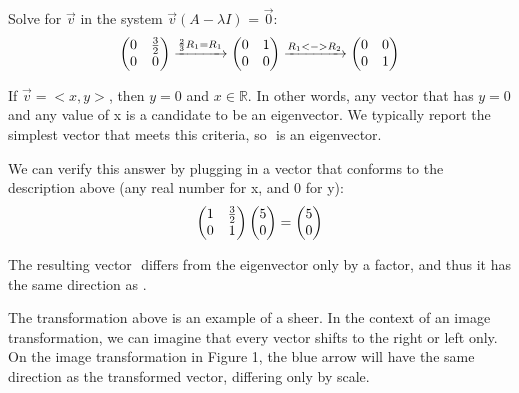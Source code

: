 \documentclass{article}
\begin{document}
 \par\noindent Solve for \( \vec v\) in the system \( \vec v (A - \lambda I)\) = \( \vec 0\):
 \[
  \left(\begin{array}{@{}cc@{}}
 	0 & \frac{3}{2} \\
 	0 & 0\\
 \end{array}\right) \xrightarrow[]{\frac{2}{3}R_1 = R_1} 
  \left(\begin{array}{@{}cc@{}}
 	0 & 1 \\
 	0 & 0\\
 \end{array}\right) \xrightarrow[]{R_1 <-> R_2}
  \left(\begin{array}{@{}cc@{}}
	0 & 0 \\
	0 & 1\\
\end{array}\right)
\]
\par \noindent If \( \vec v = <x,y> \), then \(y=0\) and \(x \in \mathbb{R}\). In other words, any vector that has \(y=0\) and any value of x is a candidate to be an eigenvector. We typically report the simplest vector that meets this criteria, so \(<1,0>\) is an eigenvector.
\newline
\newline
\newline
\begin{minipage}[c]{.5\linewidth}
\par \noindent We can verify this answer by plugging in a vector that conforms to the description above (any real number for x, and 0 for y):
\[ 
\left(\begin{array}{@{}cc@{}}
	1 & \frac{3}{2} \\
	0 & 1\\
\end{array}\right) 
\left(\begin{array}{@{}c@{}}
	5 \\
	0 \\
\end{array}\right) 
=   
\left(\begin{array}{@{}c@{}}
	5 \\
	0 \\
\end{array}\right) 
\]
\par \noindent The resulting vector \(<5,0>\) differs from the eigenvector only by a factor, and thus it has the same direction as \(<1,0>\).
\newline
\par \noindent The transformation above is an example of a sheer. In the context of an image transformation, we can imagine that every vector shifts to the right or left only. On the image transformation in Figure 1, the blue arrow will have the same direction as the transformed vector, differing only by scale.
\end{minipage}
\end{document}
